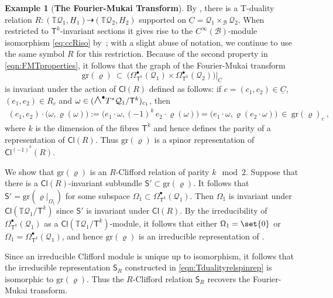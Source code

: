 \documentclass[a4paper, reqno, 11pt]{amsart}
\numberwithin{equation}{section}
\theoremstyle{definition}
\newtheorem{example}[equation]{Example}
\newcommand{\red}[1]{\underline{#1}}
\newcommand{\IT}{\mathbb{T}}
\newcommand{\Cl}{\mathsf{Cl}}
\newcommand{\cB}{{\mathcal B}}
\newcommand{\cQ}{{\mathcal Q}}
\newcommand{\sfS}{{\mathsf{S}}}
\newcommand{\sfT}{{\mathsf{T}}}
\newcommand{\sfOmega}{{\mathsf{\Omega}}}
\newcommand{\midwedge}{\text {\Large$\wedge$}}
\newcommand{\gr}{\text{gr}}
\newcommand{\rel}{\dashrightarrow}
\theoremstyle{remark}
\begin{document}
\begin{example}[\textbf{The Fourier-Mukai Transform}]
By \cite[Lemma 6.5]{DeFraja:2023fhe}, there is a T-duality relation $R \colon (\IT \cQ_1,\red H{}_1) \rel (\IT \cQ_2,\red H{}_2)$ supported on $\red C=\cQ_1 \times_\cB \cQ_2$. When restricted to $\sfT^k$-invariant sections it gives rise to the $C^\infty(\cB)$-module isomorphism \eqref{eq:ccRiso} by~\cite[Proposition~6.13]{DeFraja:2023fhe}; with a slight abuse of notation, we continue to use the same symbol $R$ for this restriction. Because of the second property in \eqref{eqn:FMTproperties}, it follows that the graph of the Fourier-Mukai transform $$\gr(\varrho) \ \subset \ \big(\sfOmega_{\sfT^k}^\bullet(\cQ_1) \times \sfOmega_{\sfT^k}^\bullet(\cQ_2)\big)\big|_{\red C} $$ is invariant under the action of $\Cl(R)$ defined as follows: if $c=(c_1,c_2) \in \red C$,  $(e_1, e_2) \in R_c$ and $\omega\in (\midwedge^\bullet T^*\cQ_1/\sfT^k)_{c_1}$, then
\begin{align}
    (e_1, e_2) \cdot \big(\omega, \varrho(\omega)\big) := \big(e_1 \cdot \omega , (-1)^k\, e_2 \cdot \varrho(\omega)\big) = \big(e_1 \cdot \omega, \varrho(e_2 \cdot \omega)\big) \ \in \ \gr(\varrho)_c \ ,
\end{align}
where $k$ is the dimension of the fibres $\sfT^k$ and hence defines the parity of a representation of $\Cl(R)$.
Thus $\gr(\varrho)$ is a spinor representation of $\Cl^{(-1)^k}(R)$.

We show that $\gr(\varrho)$ is an $R$-Clifford relation of parity $k\mod 2$. Suppose that there is a $\Cl(R)$-invariant subbundle $\sfS' \subset \gr(\varrho)$. It follows that $\sfS' = \gr(\varrho|_{\sfOmega_1})$ for some subspace $\sfOmega_1 \subset \sfOmega_{\sfT^k}^\bullet(\cQ_1)$. Then $\sfOmega_1$ is invariant under $\Cl(\IT \cQ_1/\sfT^k)$ since $\sfS'$ is invariant under $\Cl(R)$. By the irreducibility of $\sfOmega_{\sfT^k}^\bullet(\cQ_1)$ as a $\Cl(\IT \cQ_1/\sfT^k)$-module, it follows that either $\sfOmega_1 = \set{0}$ or $\sfOmega_1 = \sfOmega_{\sfT^k}^\bullet(\cQ_1)$, and hence $\gr(\varrho)$ is an irreducible representation of \smash{$\Cl^{(-1)^k}(R)$}. 

Since an irreducible Clifford module is unique up to isomorphism, it follows that the irreducible representation $\sfS_R$ constructed in \eqref{eqn:Tdualityrelspinrep} is isomorphic to $\gr(\varrho)$. Thus the $R$-Clifford relation $\sfS_R$ recovers the Fourier-Mukai transform.
\end{example}
\end{document}
